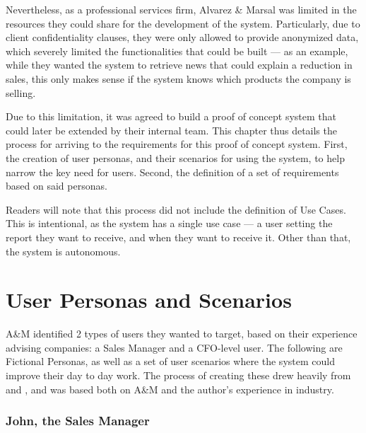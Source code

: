 \documentclass[a4paper]{report}
\begin{document}
Nevertheless, as a professional services firm, Alvarez \& Marsal was limited in the resources they could share for the development of the system. Particularly, due to client confidentiality clauses, they were only allowed to provide anonymized data, which severely limited the functionalities that could be built --- as an example, while they wanted the system to retrieve news that could explain a reduction in sales, this only makes sense if the system knows which products the company is selling.

Due to this limitation, it was agreed to build a proof of concept system that could later be extended by their internal team. This chapter thus details the process for arriving to the requirements for this proof of concept system. First, the creation of user personas, and their scenarios for using the system, to help narrow the key need for users. Second, the definition of a set of requirements based on said personas.

Readers will note that this process did not include the definition of Use Cases. This is intentional, as the system has a single use case --- a user setting the report they want to receive, and when they want to receive it. Other than that, the system is autonomous.

\section{User Personas and Scenarios}

A\&M identified 2 types of users they wanted to target, based on their experience advising companies: a Sales Manager and a CFO-level user. The following are Fictional Personas, as well as a set of user scenarios where the system could improve their day to day work. The process of creating these drew heavily from \cite{ixdf_personas_2025} and \cite{ixdf_user_scenarios_2025}, and was based both on A\&M and the author's experience in industry.

\subsubsection{John, the Sales Manager}
\end{document}

